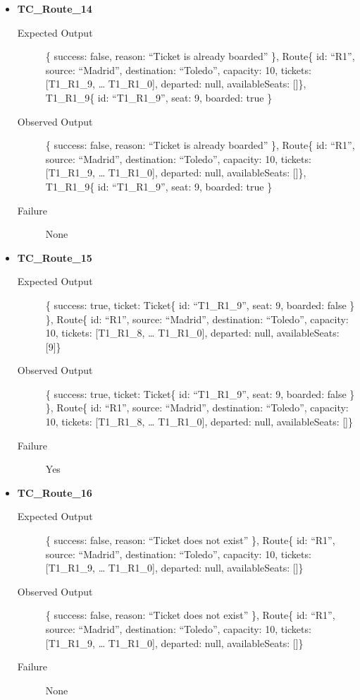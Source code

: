 \documentclass[11pt]{article}
\begin{document}
\begin{itemize}
\item \textbf{TC\_Route\_14}
\begin{description}
\item[{Expected Output}] \{ success: false, reason: “Ticket is already boarded” \},
Route\{ id: “R1”, source: “Madrid”, destination: “Toledo”, capacity: 10,  tickets: [T1\_R1\_9, … T1\_R1\_0], departed: null, availableSeats: []\}, T1\_R1\_9\{ id: “T1\_R1\_9”, seat: 9, boarded: true \}
\item[{Observed Output}] \{ success: false, reason: “Ticket is already boarded” \},
Route\{ id: “R1”, source: “Madrid”, destination: “Toledo”, capacity: 10,  tickets: [T1\_R1\_9, … T1\_R1\_0], departed: null, availableSeats: []\}, T1\_R1\_9\{ id: “T1\_R1\_9”, seat: 9, boarded: true \}
\item[{Failure}] None
\end{description}

\item \textbf{TC\_Route\_15}
\begin{description}
\item[{Expected Output}] \{ success: true, ticket:  Ticket\{ id: “T1\_R1\_9”, seat: 9, boarded: false \} \},
Route\{ id: “R1”, source: “Madrid”, destination: “Toledo”, capacity: 10,  tickets: [T1\_R1\_8, … T1\_R1\_0], departed: null, availableSeats: [9]\}
\item[{Observed Output}] \{ success: true, ticket:  Ticket\{ id: “T1\_R1\_9”, seat: 9, boarded: false \} \},
Route\{ id: “R1”, source: “Madrid”, destination: “Toledo”, capacity: 10,  tickets: [T1\_R1\_8, … T1\_R1\_0], departed: null, availableSeats: []\}
\item[{Failure}] Yes
\end{description}

\item \textbf{TC\_Route\_16}
\begin{description}
\item[{Expected Output}] \{ success: false, reason: “Ticket does not exist” \},
Route\{ id: “R1”, source: “Madrid”, destination: “Toledo”, capacity: 10,  tickets: [T1\_R1\_9, … T1\_R1\_0], departed: null, availableSeats: []\}
\item[{Observed Output}] \{ success: false, reason: “Ticket does not exist” \},
Route\{ id: “R1”, source: “Madrid”, destination: “Toledo”, capacity: 10,  tickets: [T1\_R1\_9, … T1\_R1\_0], departed: null, availableSeats: []\}
\item[{Failure}] None
\end{description}


\end{itemize}
\end{document}

